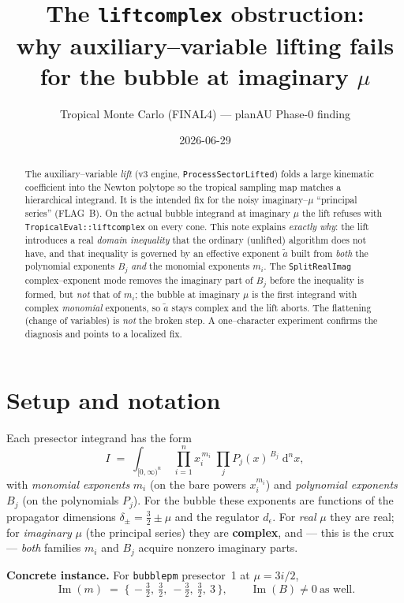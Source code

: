 \documentclass[11pt]{article}
\title{\textbf{The \texttt{liftcomplex} obstruction:\\
why auxiliary--variable lifting fails for the bubble at imaginary $\mu$}}
\author{Tropical Monte Carlo (FINAL4) --- planAU Phase-0 finding}
\date{2026-06-29}
\newcommand{\Imag}{\operatorname{Im}}
\newcommand{\atil}{\tilde{a}}
\newcommand{\code}[1]{\texttt{#1}}
\begin{document}
\maketitle

\begin{abstract}
The auxiliary--variable \emph{lift} (v3 engine, \code{ProcessSectorLifted}) folds a
large kinematic coefficient into the Newton polytope so the tropical sampling map
matches a hierarchical integrand. It is the intended fix for the noisy
imaginary--$\mu$ ``principal series'' (FLAG~B). On the actual bubble integrand at
imaginary $\mu$ the lift refuses with \code{TropicalEval::liftcomplex} on every
cone. This note explains \emph{exactly why}: the lift introduces a real
\emph{domain inequality} that the ordinary (unlifted) algorithm does not have, and
that inequality is governed by an effective exponent $\atil$ built from
\emph{both} the polynomial exponents $B_j$ \emph{and} the monomial exponents
$m_i$. The \code{SplitRealImag} complex--exponent mode removes the imaginary part of
$B_j$ before the inequality is formed, but \emph{not} that of $m_i$; the bubble at
imaginary $\mu$ is the first integrand with complex \emph{monomial} exponents, so
$\atil$ stays complex and the lift aborts. The flattening (change of variables) is
\emph{not} the broken step. A one--character experiment confirms the diagnosis and
points to a localized fix.
\end{abstract}

\section{Setup and notation}

Each presector integrand has the form
\begin{equation}
  I \;=\; \int_{[0,\infty)^n}\; \prod_{i=1}^{n} x_i^{\,m_i}\;
          \prod_{j} P_j(x)^{\,B_j}\; \mathrm{d}^n x ,
  \label{eq:integrand}
\end{equation}
with \emph{monomial exponents} $m_i$ (on the bare powers $x_i^{m_i}$) and
\emph{polynomial exponents} $B_j$ (on the polynomials $P_j$). For the bubble these
exponents are functions of the propagator dimensions $\delta_\pm = \tfrac{3}{2}\pm\mu$
and the regulator $d_\epsilon$. For \emph{real} $\mu$ they are real; for
\emph{imaginary} $\mu$ (the principal series) they are \textbf{complex}, and --- this
is the crux --- \emph{both} families $m_i$ and $B_j$ acquire nonzero imaginary parts.

\medskip
\noindent\textbf{Concrete instance.} For \code{bubblepm} presector~1 at $\mu = 3i/2$,
\[
  \Imag(m) \;=\; \bigl\{\,-\tfrac32,\ \tfrac32,\ -\tfrac32,\ \tfrac32,\ 3\,\bigr\},
  \qquad
  \Imag(B) \neq 0 \ \text{as well.}
\]
\end{document}
